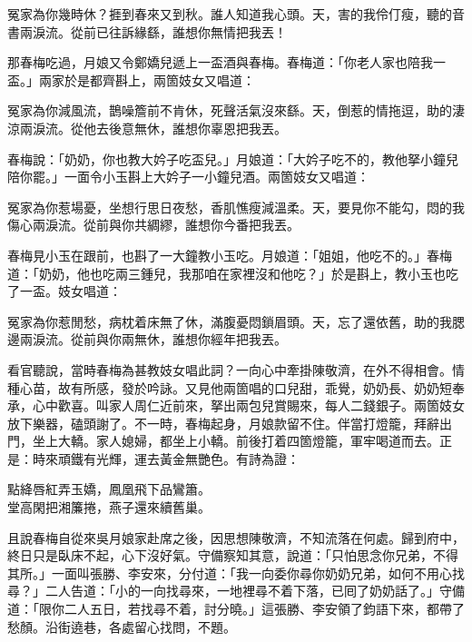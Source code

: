 \begin{myquote}
冤家為你幾時休？捱到春來又到秋。誰人知道我心頭。天，害的我伶仃瘦，聽的音書兩淚流。從前已往訴緣繇，誰想你無情把我丟！
\end{myquote}

那春梅吃過，月娘又令鄭嬌兒遞上一盃酒與春梅。春梅道：「你老人家也陪我一盃。」兩家於是都齊斟上，兩箇妓女又唱道：

\begin{myquote}
冤家為你減風流，鵲噪簷前不肯休，死聲活氣沒來繇。天，倒惹的情拖逗，助的淒涼兩淚流。從他去後意無休，誰想你辜恩把我丟。
\end{myquote}

春梅說：「奶奶，你也教大妗子吃盃兒。」月娘道：「大妗子吃不的，教他拏小鐘兒陪你罷。」一面令小玉斟上大妗子一小鐘兒酒。兩箇妓女又唱道：

\begin{myquote}
冤家為你惹場憂，坐想行思日夜愁，香肌憔瘦減溫柔。天，要見你不能勾，悶的我傷心兩淚流。從前與你共綢繆，誰想你今番把我丟。
\end{myquote}

春梅見小玉在跟前，也斟了一大鐘教小玉吃。{}月娘道：「姐姐，他吃不的。」春梅道：「奶奶，他也吃兩三鍾兒，我那咱在家裡沒和他吃？」{}於是斟上，教小玉也吃了一盃。妓女唱道：

\begin{myquote}
冤家為你惹閒愁，病枕着床無了休，滿腹憂悶鎖眉頭。天，忘了還依舊，助的我腮邊兩淚流。從前與你兩無休，誰想你經年把我丟。
\end{myquote}

看官聽說，當時春梅為甚教妓女唱此詞？一向心中牽掛陳敬濟，在外不得相會。情種心苗，故有所感，發於吟詠。又見他兩箇唱的口兒甜，乖覺，奶奶長、奶奶短奉承，心中歡喜。叫家人周仁近前來，拏出兩包兒賞賜來，每人二錢銀子。兩箇妓女放下樂器，磕頭謝了。不一時，春梅起身，月娘款留不住。伴當打燈籠，拜辭出門，坐上大轎。家人媳婦，都坐上小轎。前後打着四箇燈籠，軍牢喝道而去。正是：時來頑鐵有光輝，運去黃金無艷色。有詩為證：

\begin{myquote}
點絳唇紅弄玉嬌，鳳凰飛下品鸞簫。\\堂高閑把湘簾捲，燕子還來續舊巢。
\end{myquote}

且說春梅自從來吳月娘家赴席之後，因思想陳敬濟，不知流落在何處。{}歸到府中，終日只是臥床不起，心下沒好氣。守備察知其意，{}說道：「只怕思念你兄弟，不得其所。」一面叫張勝、李安來，分付道：「我一向委你尋你奶奶兄弟，如何不用心找尋？」二人告道：「小的一向找尋來，一地裡尋不着下落，已囘了奶奶話了。」守備道：「限你二人五日，若找尋不着，討分曉。」這張勝、李安領了鈞語下來，都帶了愁顏。沿街遶巷，各處留心找問，不題。

